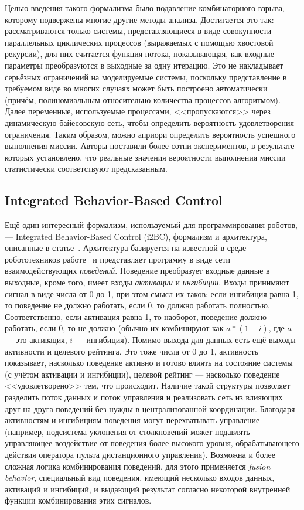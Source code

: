 \documentclass[conference]{IEEEtran}
\begin{document}
Целью введения такого формализма было подавление комбинаторного взрыва, которому 
подвержены многие другие методы анализа. Достигается это так: рассматриваются только системы, 
представляющиеся в виде совокупности параллельных циклических процессов 
(выражаемых с помощью хвостовой рекурсии), для них считается функция потока, 
показывающая, как входные параметры преобразуются в выходные за одну итерацию. 
Это не накладывает серьёзных ограничений на моделируемые системы, поскольку 
представление в требуемом виде во многих случаях может быть построено 
автоматически (причём, полиномиальным относительно количества процессов 
алгоритмом). Далее переменные, используемые процессами, <<пропускаются>> 
через динамическую байесовскую сеть, чтобы определить вероятность удовлетворения 
ограничения. Таким образом, можно априори определить вероятность успешного 
выполнения миссии. Авторы поставили более сотни экспериментов, в результате 
которых установлено, что реальные значения вероятности выполнения миссии 
статистически соответствуют предсказанным.

\subsection{Integrated Behavior-Based Control}
Ещё один интересный формализм, используемый для программирования роботов, --- 
Integrated Behavior-Based Control (i2BC), формализм и архитектура, описанные в 
статье~\cite{proetzsch2007i2bc}. Архитектура базируется на известной в среде 
робототехников работе~\cite{brooks1986layered} и представляет программу в виде 
сети взаимодействующих \textit{поведений}. Поведение преобразует входные данные в 
выходные, кроме того, имеет входы \textit{активации} и \textit{ингибиции}. Входы 
принимают сигнал в виде числа от 0 до 1, при этом смысл их таков: если ингибиция равна 1, то 
поведение не должно работать, если 0, то должно работать полностью. 
Соответственно, если активация равна 1, то наоборот, поведение должно работать, 
если 0, то не должно (обычно их комбинируют как $a * (1 - i)$, где $a$ --- это 
активация, $i$ --- ингибиция). Помимо выхода для данных есть ещё выходы 
активности и целевого рейтинга. Это тоже числа от 0 до 1, активность показывает, 
насколько поведение активно и готово влиять на состояние системы (с учётом 
активации и ингибиции), целевой рейтинг --- насколько поведение <<удовлетворено>> 
тем, что происходит. Наличие такой структуры позволяет разделить поток данных и 
поток управления и реализовать сеть из влияющих друг на друга поведений без 
нужды в централизованной координации. Благодаря активностям и ингибициям 
поведения могут перехватывать управление (например, подсистема уклонения от 
столкновений может подавлять управляющее воздействие от поведения более высокого 
уровня, обрабатывающего действия оператора пульта дистанционного управления). 
Возможна и более сложная логика комбинирования поведений, для этого применяется 
\textit{fusion behavior}, специальный вид поведения, имеющий несколько входов данных, 
активаций и ингибиций, и выдающий результат согласно некоторой внутренней функции 
комбинирования этих сигналов.
\end{document}
